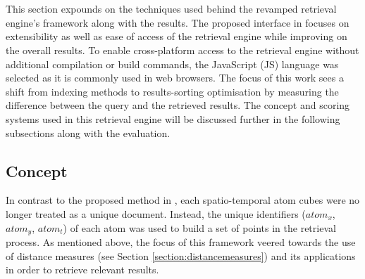 \section{\versionTwoRet}
\label{section:versionTwo}

This section expounds on the techniques used behind the revamped retrieval
engine's framework along with the results. The proposed interface in
\versionTwoRet focuses on extensibility as well as ease of access of the
retrieval engine while improving on the overall results. To enable
cross-platform access to the retrieval engine without additional compilation
or build commands, the JavaScript (JS) language was selected as it is commonly
used in web browsers.
The focus of this work sees a shift from indexing methods to results-sorting
optimisation by measuring the difference between the query and the retrieved
results. The concept and scoring systems used in this retrieval engine will be
discussed further in the following subsections along with the evaluation.

\subsection{Concept}

In contrast to the proposed method in \versionOneRet, each spatio-temporal atom
cubes were no longer treated as a unique document. Instead, the unique
identifiers ($atom_x$, $atom_y$, $atom_t$) of each atom was used to build a
set of points in the retrieval process. As mentioned above, the focus of this
framework veered towards the use of distance measures (see Section
\ref{section:distancemeasures}) and its applications in order to retrieve
relevant results.

